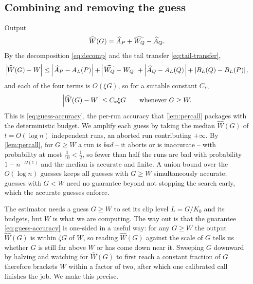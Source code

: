 \subsection{Combining and removing the guess}\label{sec:main-combine}

Output
\begin{equation}\label{eq:combine}
  \widehat W(G)=\widehat A_P+\widehat{W_Q}-\widehat A_Q .
\end{equation}
By the decomposition \eqref{eq:decomp} and the tail transfer \eqref{eq:tail-transfer},
\[
  \left|\widehat W(G)-W\right|\le\left|\widehat A_P-A_L(P)\right|+\left|\widehat{W_Q}-W_Q\right|+\left|\widehat A_Q-A_L(Q)\right|
    +\left|B_L(Q)-B_L(P)\right|,
\]
and each of the four terms is $O(\xi G)$, so for a suitable constant $C_*$,
\begin{equation}\label{eq:guess-accuracy}
  \left|\widehat W(G)-W\right|\le C_*\xi G\qquad\text{whenever }G\ge W .
\end{equation}
This is \eqref{eq:guess-accuracy}, the per-run accuracy that \cref{lem:percall} packages with the
deterministic budget. We amplify each guess by taking the median $\widehat W(G)$ of $t=O(\log n)$
independent runs, an aborted run contributing $+\infty$. By \cref{lem:percall}, for $G\ge W$ a run is
\emph{bad} -- it aborts or is inaccurate -- with probability at most $\tfrac1{10}<\tfrac12$, so fewer than
half the runs are bad with probability $1-n^{-\Omega(1)}$ and the median is accurate and finite.
A union bound over the $O(\log n)$ guesses keeps all guesses with $G\ge W$ simultaneously accurate;
guesses with $G<W$ need no guarantee beyond not stopping the search early, which the accurate guesses
enforce.

The estimator needs a guess $G\ge W$ to set its clip level $L=G/K_0$ and its budgets, but $W$ is what we
are computing. The way out is that the guarantee \eqref{eq:guess-accuracy} is one-sided in a useful way:
for any $G\ge W$ the output $\widehat W(G)$ is within $\zeta G$ of $W$, so reading $\widehat W(G)$ against
the scale of $G$ tells us whether $G$ is still far above $W$ or has come down near it. Sweeping $G$
downward by halving and watching for $\widehat W(G)$ to first reach a constant fraction of $G$ therefore
brackets $W$ within a factor of two, after which one calibrated call finishes the job. We make this
precise.

